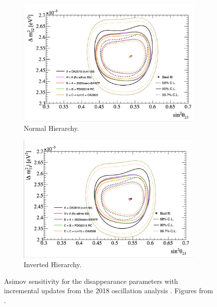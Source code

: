 \begin{figure}[!htbp]
\centering
\begin{subfigure}{.7\textwidth}
  \centering
  \includegraphics[width=0.95\linewidth, trim={0.5mm 0.5mm 0mm 0mm}, clip]{figs/jointPTheta_disNH}
  \caption{Normal Hierarchy.}
  \label{fig:20182020PTDisNH}
\end{subfigure}
\begin{subfigure}{.7\textwidth}
  \centering
  \includegraphics[width=0.95\linewidth, trim={1mm 0.5mm 0.5mm 0mm},clip]{figs/jointPTheta_disIH}
  \caption{Inverted Hierarchy.}
  \label{fig:20182020PTDisIH}
\end{subfigure}
\caption{Asimov sensitivity for the disappearance parameters with incremental updates from the 2018 oscillation analysis \cite{t2knature}. Figures from \cite{tn397}.}
\label{fig:20182020DisPT}
\end{figure}

